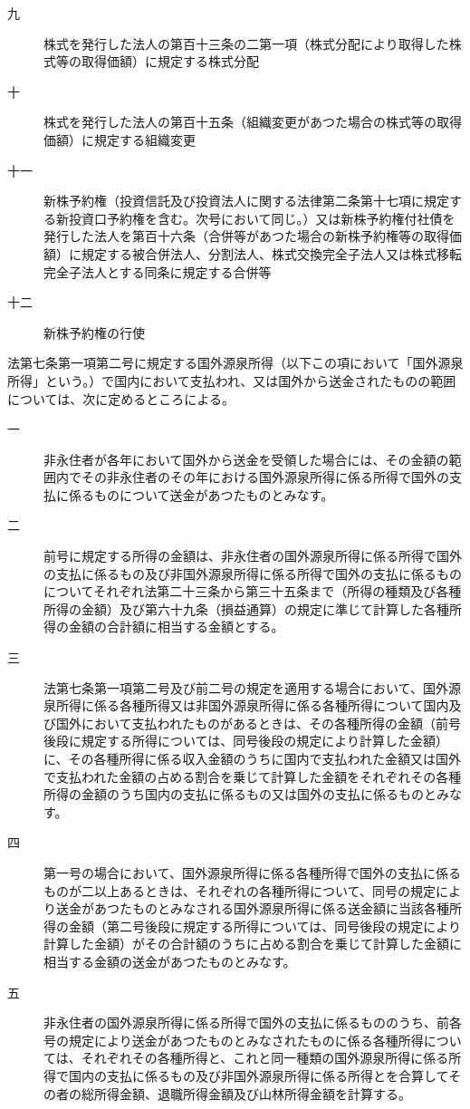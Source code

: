 \documentclass[twocolumn,a4j,10pt]{ltjtarticle}
\begin{document}
\begin{description}
\begin{description}
\item[九]株式を発行した法人の第百十三条の二第一項（株式分配により取得した株式等の取得価額）に規定する株式分配
\item[十]株式を発行した法人の第百十五条（組織変更があつた場合の株式等の取得価額）に規定する組織変更
\item[十一]新株予約権（投資信託及び投資法人に関する法律第二条第十七項に規定する新投資口予約権を含む。次号において同じ。）又は新株予約権付社債を発行した法人を第百十六条（合併等があつた場合の新株予約権等の取得価額）に規定する被合併法人、分割法人、株式交換完全子法人又は株式移転完全子法人とする同条に規定する合併等
\item[十二]新株予約権の行使
\end{description}
\item[\rensuji{4}]法第七条第一項第二号に規定する国外源泉所得（以下この項において「国外源泉所得」という。）で国内において支払われ、又は国外から送金されたものの範囲については、次に定めるところによる。
\begin{description}
\item[一]非永住者が各年において国外から送金を受領した場合には、その金額の範囲内でその非永住者のその年における国外源泉所得に係る所得で国外の支払に係るものについて送金があつたものとみなす。
\item[二]前号に規定する所得の金額は、非永住者の国外源泉所得に係る所得で国外の支払に係るもの及び非国外源泉所得に係る所得で国外の支払に係るものについてそれぞれ法第二十三条から第三十五条まで（所得の種類及び各種所得の金額）及び第六十九条（損益通算）の規定に準じて計算した各種所得の金額の合計額に相当する金額とする。
\item[三]法第七条第一項第二号及び前二号の規定を適用する場合において、国外源泉所得に係る各種所得又は非国外源泉所得に係る各種所得について国内及び国外において支払われたものがあるときは、その各種所得の金額（前号後段に規定する所得については、同号後段の規定により計算した金額）に、その各種所得に係る収入金額のうちに国内で支払われた金額又は国外で支払われた金額の占める割合を乗じて計算した金額をそれぞれその各種所得の金額のうち国内の支払に係るもの又は国外の支払に係るものとみなす。
\item[四]第一号の場合において、国外源泉所得に係る各種所得で国外の支払に係るものが二以上あるときは、それぞれの各種所得について、同号の規定により送金があつたものとみなされる国外源泉所得に係る送金額に当該各種所得の金額（第二号後段に規定する所得については、同号後段の規定により計算した金額）がその合計額のうちに占める割合を乗じて計算した金額に相当する金額の送金があつたものとみなす。
\item[五]非永住者の国外源泉所得に係る所得で国外の支払に係るもののうち、前各号の規定により送金があつたものとみなされたものに係る各種所得については、それぞれその各種所得と、これと同一種類の国外源泉所得に係る所得で国内の支払に係るもの及び非国外源泉所得に係る所得とを合算してその者の総所得金額、退職所得金額及び山林所得金額を計算する。

\end{description}
\end{description}
\end{document}
